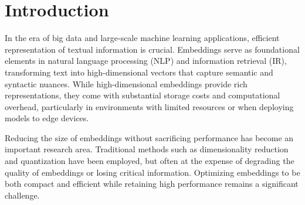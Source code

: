 \documentclass[acmtog, authorversion]{acmart}
\begin{document}




\maketitle

\section{Introduction}  
  
In the era of big data and large-scale machine learning applications, efficient representation of textual information is crucial. Embeddings serve as foundational elements in natural language processing (NLP) and information retrieval (IR), transforming text into high-dimensional vectors that capture semantic and syntactic nuances. While high-dimensional embeddings provide rich representations, they come with substantial storage costs and computational overhead, particularly in environments with limited resources or when deploying models to edge devices.  
  
Reducing the size of embeddings without sacrificing performance has become an important research area. Traditional methods such as dimensionality reduction and quantization have been employed, but often at the expense of degrading the quality of embeddings or losing critical information. Optimizing embeddings to be both compact and efficient while retaining high performance remains a significant challenge.  
  
\end{document}
